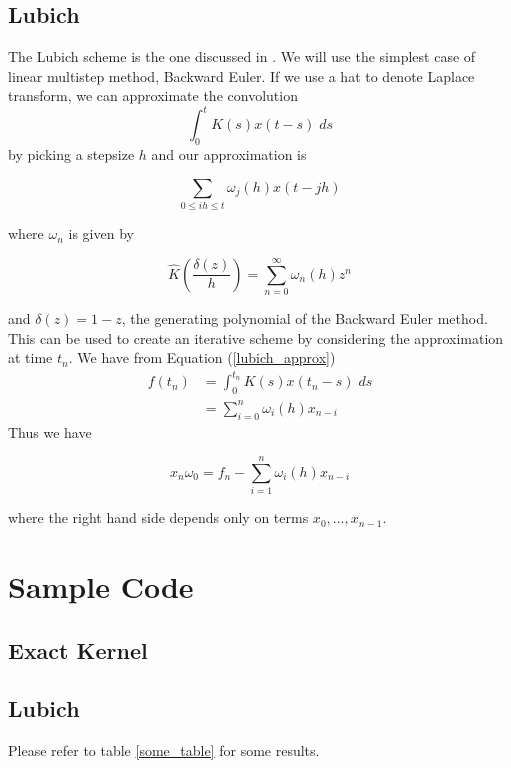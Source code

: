 \documentclass[11pt]{article}
\numberwithin{equation}{section}
\theoremstyle{definition}
\newcommand{\eqn}[2]{
  \begin{equation}
    \label{#1}
    #2
  \end{equation}
}
\newcommand{\eqr}[1]{Equation (\ref{#1})}
\begin{document}
\subsection{Lubich}
The Lubich scheme is the one discussed in \cite{lubich}. We will use the simplest
case of linear multistep method, Backward Euler. If we use a hat to denote Laplace
transform, we can approximate the convolution
$$
  \int_0^t K(s) x(t - s)\; ds
$$
by picking a stepsize $h$ and our approximation is
\eqn{lubich_approx}{
  \sum_{0 \leq ih \leq t} \omega_j(h) x(t - jh)
}
where $\omega_n$ is given by
\eqn{lubich_omega}{
  \hat{K}\left(\frac{\delta(z)}{h}\right) = \sum_{n=0}^\infty \omega_n(h) z^n
}
and $\delta(z) = 1-z$, the generating polynomial of the Backward Euler method.
This can be used to create an iterative scheme by considering the approximation
at time $t_n$. We have from \eqr{lubich_approx}
\begin{align}
\nonumber  f(t_n)
                  &= \int_0^{t_n} K(s) x(t_n - s)\; ds \\
                  &= \sum_{i=0}^{n} \omega_i(h) x_{n-i}
\end{align}
Thus we have
\eqn{lubich_scheme}{
  x_n \omega_0 = f_n - \sum_{i=1}^n \omega_i(h) x_{n-i}
}
where the right hand side depends only on terms $x_0, ..., x_{n-1}$.
\section{Sample Code}
\subsection{Exact Kernel}
\lstset{caption=Exact Kernel Scheme}

\subsection{Lubich}
\lstset{caption=Lubich Scheme}

Please refer to table \ref{some_table} for some results.
\end{document}
